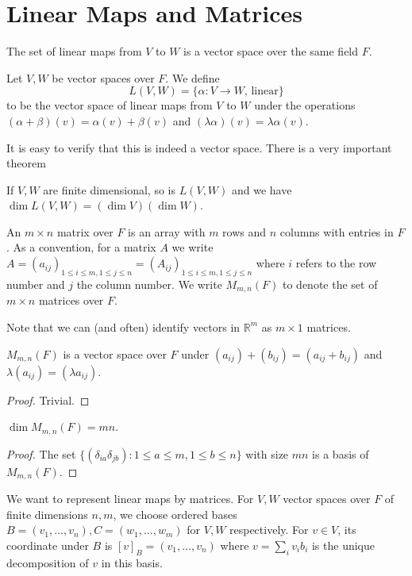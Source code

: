 \section{Linear Maps and Matrices}
The set of linear maps from $V$ to $W$ is a vector space over the same field $F$.
\begin{definition}
    Let $V,W$ be vector spaces over $F$.
    We define
    $$L(V,W)=\{\alpha:V\to W\text{, linear}\}$$
    to be the vector space of linear maps from $V$ to $W$ under the operations $(\alpha+\beta)(v)=\alpha(v)+\beta(v)$ and $(\lambda\alpha)(v)=\lambda\alpha(v)$.
\end{definition}
It is easy to verify that this is indeed a vector space.
There is a very important theorem
\begin{proposition}\label{linear_map_matrices}
    If $V,W$ are finite dimensional, so is $L(V,W)$ and we have $\dim L(V,W)=(\dim V)(\dim W)$.
\end{proposition}
\begin{definition}
    An $m\times n$ matrix over $F$ is an array with $m$ rows and $n$ columns with entries in $F$.
    As a convention, for a matrix $A$ we write $A=(a_{ij})_{1\le i\le m,1\le j\le n}=(A_{ij})_{1\le i\le m,1\le j\le n}$ where $i$ refers to the row number and $j$ the column number.
    We write $M_{m,n}(F)$ to denote the set of $m\times n$ matrices over $F$.
\end{definition}
Note that we can (and often) identify vectors in $\mathbb R^m$ as $m\times 1$ matrices.
\begin{proposition}
    $M_{m,n}(F)$ is a vector space over $F$ under $(a_{ij})+(b_{ij})=(a_{ij}+b_{ij})$ and $\lambda(a_{ij})=(\lambda a_{ij})$.
\end{proposition}
\begin{proof}
    Trivial.
\end{proof}
\begin{proposition}
    $\dim M_{m,n}(F)=mn$.
\end{proposition}
\begin{proof}
    The set $\{(\delta_{ia}\delta_{jb}):1\le a\le m,1\le b\le n\}$ with size $mn$ is a basis of $M_{m,n}(F)$.
\end{proof}
We want to represent linear maps by matrices.
For $V,W$ vector spaces over $F$ of finite dimensions $n,m$, we choose ordered bases $B=(v_1,\ldots,v_n),C=(w_1,\ldots,w_m)$ for $V,W$ respectively.
For $v\in V$, its coordinate under $B$ is $[v]_B=(v_1,\ldots,v_n)$ where $v=\sum_{i}v_ib_i$ is the unique decomposition of $v$ in this basis.

